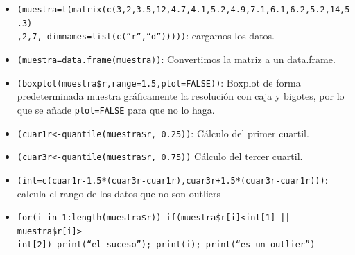 \documentclass[a4paper, 12pt]{article}
\begin{document}
	\begin{itemize}
		\item \texttt{(muestra=t(matrix(c(3,2,3.5,12,4.7,4.1,5.2,4.9,7.1,6.1,6.2,5.2,14,5.3)\\,2,7, dimnames=list(c(``r'',``d'')))))}: cargamos los datos.
		\item \texttt{(muestra=data.frame(muestra))}: Convertimos la matriz a un data.frame.
		\item \texttt{(boxplot(muestra\$r,range=1.5,plot=FALSE))}: Boxplot de forma predeterminada muestra gráficamente la resolución con caja y bigotes, por lo que se añade \texttt{plot=FALSE} para que no lo haga.
		\item \texttt{(cuar1r<-quantile(muestra\$r, 0.25))}: Cálculo del primer cuartil.
		\item \texttt{(cuar3r<-quantile(muestra\$r, 0.75))} Cálculo del tercer cuartil.
		\item \texttt{(int=c(cuar1r-1.5*(cuar3r-cuar1r),cuar3r+1.5*(cuar3r-cuar1r)))}: calcula el rango de los datos que no son outliers
		\item \texttt{for(i in 1:length(muestra\$r)) {if(muestra\$r[i]<int[1] || muestra\$r[i]>\\int[2]) {print(``el suceso''); print(i); print(``es un outlier'')}}}
	\end{itemize}
\end{document}
